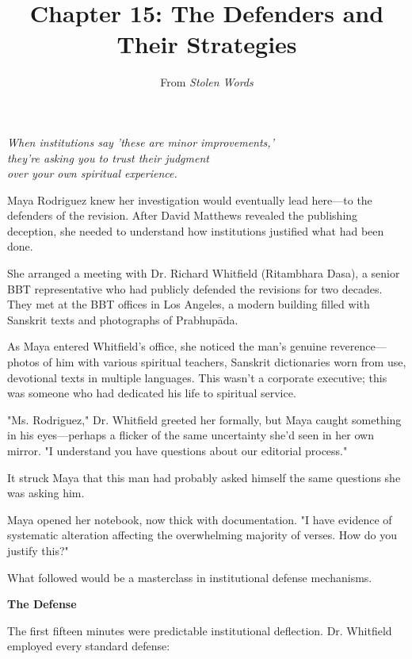 \documentclass[12pt]{article}
\title{Chapter 15: The Defenders and Their Strategies}
\author{From \textit{Stolen Words}}
\date{}
\begin{document}
\maketitle

\vspace{1cm}

{\centering\itshape When institutions say 'these are minor improvements,'\\they're asking you to trust their judgment\\over your own spiritual experience.\par}
\vspace{0.5cm}

\justifying

Maya Rodriguez knew her investigation would eventually lead here—to the defenders of the revision. After David Matthews revealed the publishing deception, she needed to understand how institutions justified what had been done.

She arranged a meeting with Dr. Richard Whitfield (Ritambhara Dasa), a senior BBT representative who had publicly defended the revisions for two decades. They met at the BBT offices in Los Angeles, a modern building filled with Sanskrit texts and photographs of Prabhupāda.

As Maya entered Whitfield's office, she noticed the man's genuine reverence—photos of him with various spiritual teachers, Sanskrit dictionaries worn from use, devotional texts in multiple languages. This wasn't a corporate executive; this was someone who had dedicated his life to spiritual service.

"Ms. Rodriguez," Dr. Whitfield greeted her formally, but Maya caught something in his eyes—perhaps a flicker of the same uncertainty she'd seen in her own mirror. "I understand you have questions about our editorial process."

It struck Maya that this man had probably asked himself the same questions she was asking him.

Maya opened her notebook, now thick with documentation. "I have evidence of systematic alteration affecting the overwhelming majority of verses. How do you justify this?"

What followed would be a masterclass in institutional defense mechanisms.


\vspace{0.5cm}
\textbf{The Defense}
\vspace{0.2cm}


The first fifteen minutes were predictable institutional deflection. Dr. Whitfield employed every standard defense:
\end{document}
